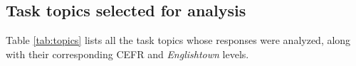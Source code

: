 \begin{appendices}
\appendixpage

\section{Task topics selected for analysis}
\label{app:topic}

Table \ref{tab:topics} lists all the task topics whose responses were analyzed, along with their corresponding CEFR and \textit{Englishtown} levels.  


\end{appendices}